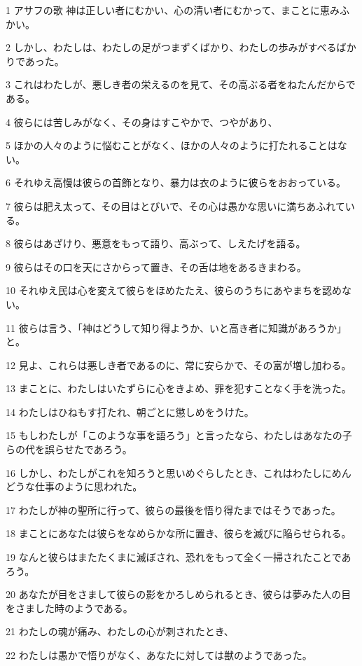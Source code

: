 \par 1 アサフの歌 神は正しい者にむかい、心の清い者にむかって、まことに恵みふかい。
\par 2 しかし、わたしは、わたしの足がつまずくばかり、わたしの歩みがすべるばかりであった。
\par 3 これはわたしが、悪しき者の栄えるのを見て、その高ぶる者をねたんだからである。
\par 4 彼らには苦しみがなく、その身はすこやかで、つやがあり、
\par 5 ほかの人々のように悩むことがなく、ほかの人々のように打たれることはない。
\par 6 それゆえ高慢は彼らの首飾となり、暴力は衣のように彼らをおおっている。
\par 7 彼らは肥え太って、その目はとびいで、その心は愚かな思いに満ちあふれている。
\par 8 彼らはあざけり、悪意をもって語り、高ぶって、しえたげを語る。
\par 9 彼らはその口を天にさからって置き、その舌は地をあるきまわる。
\par 10 それゆえ民は心を変えて彼らをほめたたえ、彼らのうちにあやまちを認めない。
\par 11 彼らは言う、「神はどうして知り得ようか、いと高き者に知識があろうか」と。
\par 12 見よ、これらは悪しき者であるのに、常に安らかで、その富が増し加わる。
\par 13 まことに、わたしはいたずらに心をきよめ、罪を犯すことなく手を洗った。
\par 14 わたしはひねもす打たれ、朝ごとに懲しめをうけた。
\par 15 もしわたしが「このような事を語ろう」と言ったなら、わたしはあなたの子らの代を誤らせたであろう。
\par 16 しかし、わたしがこれを知ろうと思いめぐらしたとき、これはわたしにめんどうな仕事のように思われた。
\par 17 わたしが神の聖所に行って、彼らの最後を悟り得たまではそうであった。
\par 18 まことにあなたは彼らをなめらかな所に置き、彼らを滅びに陥らせられる。
\par 19 なんと彼らはまたたくまに滅ぼされ、恐れをもって全く一掃されたことであろう。
\par 20 あなたが目をさまして彼らの影をかろしめられるとき、彼らは夢みた人の目をさました時のようである。
\par 21 わたしの魂が痛み、わたしの心が刺されたとき、
\par 22 わたしは愚かで悟りがなく、あなたに対しては獣のようであった。
